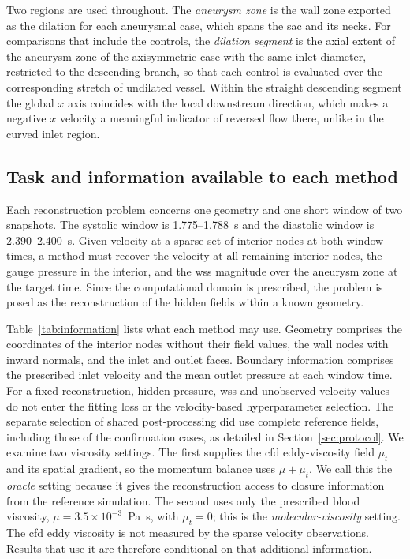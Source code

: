 \documentclass[12pt,a4paper]{article}
\newcommand{\cfdrevision}[1]{#1} %
\newcommand{\CFD}{\ac{cfd}\xspace}
\newcommand{\WSS}{\ac{wss}\xspace}
\theoremstyle{definition}
\numberwithin{equation}{section}
\providecommand{\DIFaddtex}[1]{{\protect\color{blue} \sf #1}} %
\providecommand{\DIFdeltex}[1]{{\protect\color{red} \scriptsize #1}} %
\providecommand{\DIFaddbegin}{} %
\providecommand{\DIFaddend}{} %
\providecommand{\DIFdelbegin}{} %
\providecommand{\DIFdelend}{} %
\providecommand{\DIFadd}[1]{\texorpdfstring{\DIFaddtex{#1}}{#1}} %
\providecommand{\DIFdel}[1]{\texorpdfstring{\DIFdeltex{#1}}{}} %
\newcommand{\DIFscaledelfig}{0.5}
\newlength{\DIFdelgraphicswidth} %
\newlength{\DIFdelgraphicsheight} %
\newcommand{\DIFaddincludegraphics}[2][]{{\color{blue}\fbox{\DIFOincludegraphics[#1]{#2}}}} %
\newcommand{\DIFdelincludegraphics}[2][]{%
\sbox{\DIFdelgraphicsbox}{\DIFOincludegraphics[#1]{#2}}%
\settoboxwidth{\DIFdelgraphicswidth}{\DIFdelgraphicsbox} %
\settoboxtotalheight{\DIFdelgraphicsheight}{\DIFdelgraphicsbox} %
\scalebox{\DIFscaledelfig}{%
\parbox[b]{\DIFdelgraphicswidth}{\usebox{\DIFdelgraphicsbox}\\[-\baselineskip] \rule{\DIFdelgraphicswidth}{0em}}\llap{\resizebox{\DIFdelgraphicswidth}{\DIFdelgraphicsheight}{%
\setlength{\unitlength}{\DIFdelgraphicswidth}%
\begin{picture}(1,1)%
\thicklines\linethickness{2pt} %
{\color[rgb]{1,0,0}\put(0,0){\framebox(1,1){}}}%
{\color[rgb]{1,0,0}\put(0,0){\line( 1,1){1}}}%
{\color[rgb]{1,0,0}\put(0,1){\line(1,-1){1}}}%
\end{picture}%
}\hspace*{3pt}}} %
} %
\DeclareRobustCommand{\DIFaddbegin}{\DIFOaddbegin \let\includegraphics\DIFaddincludegraphics} %
\DeclareRobustCommand{\DIFaddend}{\DIFOaddend \let\includegraphics\DIFOincludegraphics} %
\DeclareRobustCommand{\DIFdelbegin}{\DIFOdelbegin \let\includegraphics\DIFdelincludegraphics} %
\DeclareRobustCommand{\DIFdelend}{\DIFOaddend \let\includegraphics\DIFOincludegraphics} %
\renewcommand{\DIFaddtex}[1]{{\protect\color{red}#1}}
\renewcommand{\DIFdeltex}[1]{}
\renewcommand{\DIFdel}[1]{}
\renewcommand{\DIFaddincludegraphics}[2][]{\DIFOincludegraphics[#1]{#2}}
\renewcommand{\DIFdelincludegraphics}[2][]{}
\renewcommand{\cfdrevision}[1]{\textcolor{red}{#1}}
\def\DIFaddbegin{}\def\DIFaddend{}%
\def\DIFdelbegin{}\def\DIFdelend{}%
\def\cfdrevision#1{#1}%
\begin{document}
Two regions are used throughout. The \emph{aneurysm zone} is the wall zone exported as the dilation for each aneurysmal case, which spans the sac and its necks. For comparisons that include the controls, the \emph{dilation segment} is the axial extent of the aneurysm zone of the axisymmetric case with the same inlet diameter, restricted to the descending branch, so that each control is evaluated over the corresponding stretch of undilated vessel. Within the straight descending segment the global $x$ axis coincides with the local downstream direction, which makes a negative $x$ velocity a meaningful indicator of reversed flow there, unlike in the curved inlet region.


\subsection{Task and information available to each method}
\label{sec:task}
Each reconstruction problem concerns one geometry and one short window of two snapshots. %
The systolic window is 1.775--1.788~s and the diastolic window is 2.390--2.400~s. Given velocity at a sparse set of interior nodes at both window times, a method must recover the velocity at all remaining interior nodes, the gauge pressure in the interior, and the \WSS magnitude over the aneurysm zone at the target time. Since the computational domain is prescribed, the problem is posed as the reconstruction of the hidden fields within a known geometry.

Table~\ref{tab:information} lists what each method may use. Geometry comprises the coordinates of the interior nodes without their field values, the wall nodes with inward normals, and the inlet and outlet faces. Boundary information comprises the prescribed inlet velocity and the mean outlet pressure at each window time. \DIFdelbegin \DIFdel{Pressure, }\DIFdelend \DIFaddbegin \DIFadd{For a fixed reconstruction, hidden pressure, }\DIFaddend \WSS and \DIFdelbegin \DIFdel{velocity at unobserved nodes are never used for fitting or selection. }\DIFdelend \DIFaddbegin \DIFadd{unobserved velocity values do not enter the fitting loss or the velocity-based hyperparameter selection. \cfdrevision{The separate selection of shared post-processing did use complete reference fields, including those of the confirmation cases, as detailed in Section~\ref{sec:protocol}.} }\DIFaddend We examine two viscosity settings. The first supplies the \CFD eddy-viscosity field $\mu_t$ and its spatial gradient, so the momentum balance uses $\mu+\mu_t$. We call this the \emph{oracle} setting because it gives the reconstruction access to closure information from the reference simulation. The second uses only the prescribed blood viscosity, $\mu=3.5\times10^{-3}$~Pa~s, with $\mu_t=0$; this is the \emph{molecular-viscosity} setting. The \CFD eddy viscosity is not measured by the sparse velocity observations. Results that use it are therefore conditional on that additional information.
\end{document}
